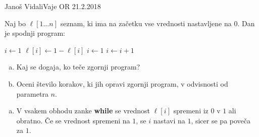 \begin{naloga}{Janoš Vidali}{Vaje OR 21.2.2018}
\begin{vprasanje}
Naj bo $\ell[1 \dots n]$ seznam,
ki ima na začetku vse vrednosti nastavljene na $0$.
Dan je spodnji program:

\begin{small}
\begin{algorithmic}
\State $i \gets 1$
    \State $\ell[i] \gets 1 - \ell[i]$
        \State $i \gets 1$
    \Else
        \State $i \gets i+1$
    \EndIf
\EndWhile
\end{algorithmic}
\end{small}

\begin{enumerate}[(a)]
\item Kaj se dogaja, ko teče zgornji program?
\item Oceni število korakov, ki jih opravi zgornji program,
v odvisnosti od parametra $n$.
\end{enumerate}
\end{vprasanje}

\begin{odgovor}
\begin{enumerate}[(a)]
\item V vsakem obhodu zanke {\bf while}
se vrednost $\ell[i]$ spremeni iz $0$ v $1$ ali obratno.
Če se vrednost spremeni na $1$, se $i$ nastavi na $1$,
sicer se pa poveča za $1$.


\end{enumerate}
\end{odgovor}
\end{naloga}
